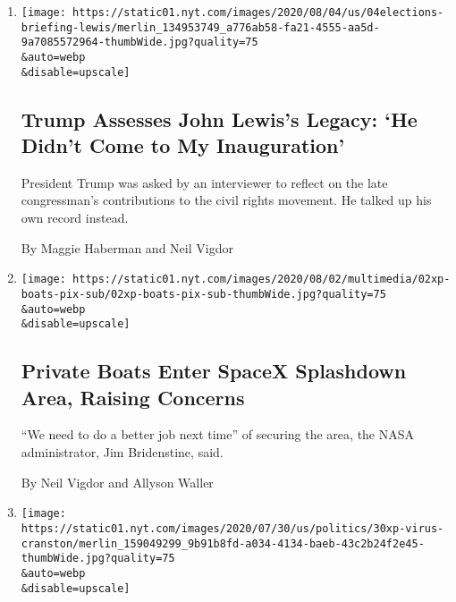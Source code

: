 \begin{enumerate}
\def\labelenumi{\arabic{enumi}.}
\item
  \href{/2020/08/04/us/politics/trump-john-lewis-axios.html}{}

  \texttt{[image: https://static01.nyt.com/images/2020/08/04/us/04elections-briefing-lewis/merlin\_134953749\_a776ab58-fa21-4555-aa5d-9a7085572964-thumbWide.jpg?quality=75\\\&auto=webp\\\&disable=upscale]}

  \hypertarget{trump-assesses-john-lewiss-legacy-he-didnt-come-to-my-inauguration}{%
  \subsection{Trump Assesses John Lewis's Legacy: `He Didn't Come to My
  Inauguration'}\label{trump-assesses-john-lewiss-legacy-he-didnt-come-to-my-inauguration}}

  President Trump was asked by an interviewer to reflect on the late
  congressman's contributions to the civil rights movement. He talked up
  his own record instead.

  By Maggie Haberman and Neil Vigdor
\item
  \href{/2020/08/02/us/flag-boat-SpaceX.html}{}

  \texttt{[image: https://static01.nyt.com/images/2020/08/02/multimedia/02xp-boats-pix-sub/02xp-boats-pix-sub-thumbWide.jpg?quality=75\\\&auto=webp\\\&disable=upscale]}

  \hypertarget{private-boats-enter-spacex-splashdown-area-raising-concerns}{%
  \subsection{Private Boats Enter SpaceX Splashdown Area, Raising
  Concerns}\label{private-boats-enter-spacex-splashdown-area-raising-concerns}}

  ``We need to do a better job next time'' of securing the area, the
  NASA administrator, Jim Bridenstine, said.

  By Neil Vigdor and Allyson Waller
\item
  \href{/2020/07/31/arts/television/bryan-cranston-coronavirus-plasma.html}{}

  \texttt{[image: https://static01.nyt.com/images/2020/07/30/us/politics/30xp-virus-cranston/merlin\_159049299\_9b91b8fd-a034-4134-baeb-43c2b24f2e45-thumbWide.jpg?quality=75\\\&auto=webp\\\&disable=upscale]}

  \hypertarget{bryan-cranston-star-of-breaking-bad-says-hes-recovered-from-the-coronavirus}{%
}
\end{enumerate}
